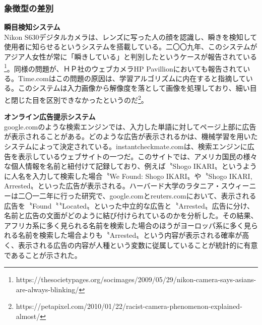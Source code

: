 \documentclass[b5j,twoside,twocolumn]{utarticle}
\begin{document}

\subsubsection*{象徴型の差別}
\textbf{瞬目検知システム}\\
Nikon S630デジタルカメラは、レンズに写った人の顔を認識し、瞬きを検知して使用者に知らせるというシステムを搭載している。二〇〇九年、このシステムがアジア人女性が常に「瞬きしている」と判別したというケースが報告されている\footnote{https://thesocietypages.org/socimages/2009/05/29/nikon-camera-says-asians-are-always-blinking/}。同様の問題が、ＨＰ社のウェブカメラHP Pavillionにおいても報告されている。Time.comはこの問題の原因は、学習アルゴリズムに内在すると指摘している。このシステムは入力画像から解像度を落として画像を処理しており、細い目と閉じた目を区別できなかったというのだ\footnote{https://petapixel.com/2010/01/22/racist-camera-phenomenon-explained-almost/}。

\textbf{オンライン広告提示システム}\\
google.comのような検索エンジンでは、入力した単語に対してページ上部に広告が表示されることがある。どのような広告が表示されるかは、機械学習を用いたシステムによって決定されている。instantcheckmate.comは、検索エンジンに広告を表示しているウェブサイトの一つだ。このサイトでは、アメリカ国民の様々な個人情報を名前と紐付けて記録しており、例えば〝Shogo IKARI〟というように人名を入力して検索した場合〝We Found: Shogo IKARI〟や〝Shogo IKARI, Arrested〟といった広告が表示される。ハーバード大学のラタニア・スウィーニーは二〇一二年に行った研究\cite{DBLP:journals/corr/abs-1301-6822}で、google.comとreuters.comにおいて、表示される広告を〝Found〝〝Located〟といった中立的な広告と〝Arrested〟広告に分け、名前と広告の文面がどのように結び付けられているのかを分析した。その結果、アフリカ系に多く見られる名前を検索した場合のほうがヨーロッパ系に多く見られる名前を検索した場合よりも〝Arrested〟という内容が表示される確率が高く、表示される広告の内容が人種という変数に従属していることが統計的に有意であることが示された。\\
\end{document}
